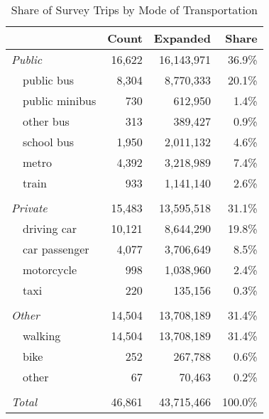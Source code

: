 \begin{table}[!htbp]
  \centering
  \caption{Share of Survey Trips by Mode of Transportation}
  \label{table:mode-share}
  
    \begin{tabular}{llrrr}
    \toprule
    \toprule
      &   & Count & Expanded & Share \\
    \midrule
    \multicolumn{2}{l}{\textit{Public}} & 16,622 & 16,143,971 & 36.9\% \\
      & public bus & 8,304 & 8,770,333 & 20.1\% \\
      & public minibus & 730 & 612,950 & 1.4\% \\
      & other bus & 313 & 389,427 & 0.9\% \\
      & school bus & 1,950 & 2,011,132 & 4.6\% \\
      & metro & 4,392 & 3,218,989 & 7.4\% \\
      & train & 933 & 1,141,140 & 2.6\% \\
      &   &   &   &  \\
    \multicolumn{2}{l}{\textit{Private}} & 15,483 & 13,595,518 & 31.1\% \\
      & driving car & 10,121 & 8,644,290 & 19.8\% \\
      & car passenger & 4,077 & 3,706,649 & 8.5\% \\
      & motorcycle & 998 & 1,038,960 & 2.4\% \\
      & taxi & 220 & 135,156 & 0.3\% \\
      &   &   &   &  \\
    \multicolumn{2}{l}{\textit{Other}} & 14,504 & 13,708,189 & 31.4\% \\
      & walking & 14,504 & 13,708,189 & 31.4\% \\
      & bike & 252 & 267,788 & 0.6\% \\
      & other & 67 & 70,463 & 0.2\% \\
      &   &   &   &  \\
    \multicolumn{2}{l}{\textit{Total}} & 46,861 & 43,715,466 & 100.0\% \\
    \bottomrule
    \bottomrule
    \end{tabular}%
  \label{tab:addlabel}%
\end{table}%
